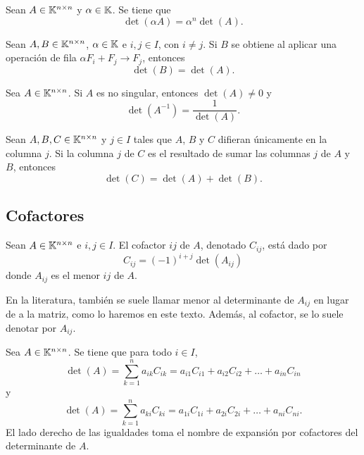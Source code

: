 \documentclass[a4,11pt]{aleph-notas}
\begin{document}
\begin{teo}
    Sean $A\in \Mat[\K]{n}{n}$ y $\alpha \in\K$. Se tiene que
    \[
        \det(\alpha A) = \alpha^n \det(A).
    \]
\end{teo}

\begin{teo}
    Sean $A, B \in \Mat[\K]{n}{n}$, $\alpha\in\K$ e $i,j\in I$, con $i\neq j$. Si $B$ se obtiene al aplicar una operación de fila $\alpha F_i + F_j \to F_j$, entonces 
    \[
        \det(B) = \det(A).
    \]
\end{teo}
 

\begin{teo}
    Sea $A \in \Mat[\K]{n}{n}$. Si $A$ es no singular, entonces $\det(A) \neq 0$ y 
    \[
        \det(A^{-1}) = \dfrac{1}{\det(A)}.
    \]
\end{teo}

\begin{teo}
    Sean $A, B, C \in \Mat[\K]{n}{n}$ y $j\in I$ tales que $A$, $B$ y $C$ difieran únicamente en la columna $j$. Si la columna $j$ de $C$ es el resultado de sumar las columnas $j$ de $A$ y $B$, entonces 
    \[
        \det(C) = \det(A) + \det(B).
    \]
\end{teo}

\subsection{Cofactores}

\begin{defi}[Cofactores]
    Sean $A\in \Mat[\K]{n}{n}$ e $i,j\in I$. El cofactor $ij$ de $A$, denotado $C_{ij}$, está dado por
    \[
        C_{ij} = (-1)^{i+j} \det (A_{ij})
    \]
     donde $A_{ij}$ es el menor $ij$ de $A$.
\end{defi}

\begin{advertencia}
    En la literatura, también se suele llamar menor al determinante de $A_{ij}$ en lugar de a la matriz, como lo haremos en este texto. Además, al cofactor, se lo suele denotar por $A_{ij}$.
\end{advertencia}

\begin{teo}
    Sea $A \in \Mat[\K]{n}{n}$. Se tiene que para todo $i\in I$,
    \[
        \det(A) 
        = \sum_{k=1}^n a_{ik}C_{ik} 
        = a_{i1}C_{i1} + a_{i2}C_{i2} + \ldots + a_{in}C_{in}
    \]
    y
    \[
        \det(A) 
        = \sum_{k=1}^n a_{ki}C_{ki} 
        = a_{1i}C_{1i} + a_{2i}C_{2i} + \ldots + a_{ni}C_{ni}.
    \]
    El lado derecho de las igualdades toma el nombre de expansión por cofactores del determinante de $A$.
\end{teo}
\end{document}
